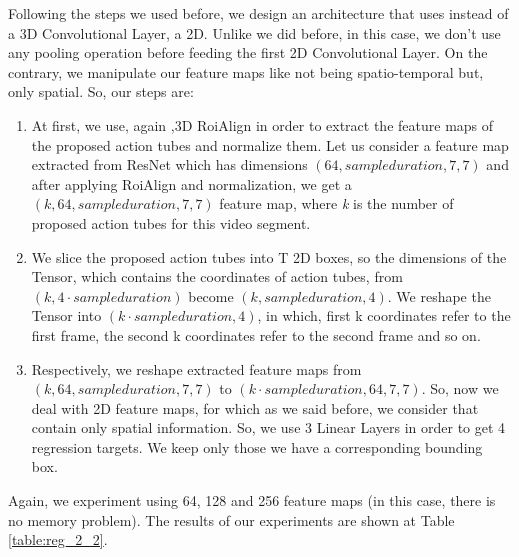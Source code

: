 Following the steps we used before, we design an architecture that uses instead of a 3D Convolutional Layer, a 2D. Unlike we did before, in this case, we don't
use any pooling operation before feeding the first 2D Convolutional Layer. On the contrary, we manipulate our feature maps like not being spatio-temporal but,
only spatial. So, our steps are:
\begin{enumerate}
\item At first, we use, again ,3D RoiAlign in order to extract the feature maps of the proposed action tubes and normalize them. Let us consider a feature map
  extracted from ResNet which has dimensions $(64,sample duration,7,7)$ and after applying RoiAlign and normalization, we get a $(k,64,sample duration,7,7)$ feature map,
  where \textit{k} is the number of proposed  action tubes for this video segment.
\item We slice the proposed action tubes into T 2D boxes, so the dimensions of the Tensor, which contains the coordinates of action tubes, from $(k,4\cdot sample duration)$
  become $(k,sample duration, 4)$. We reshape the Tensor into $(k\cdot sample duration, 4)$, in which, first k coordinates refer to the first frame, the
  second k coordinates refer to the second frame and so on.
\item Respectively, we reshape extracted feature maps from $(k, 64, sample duration, 7, 7)$ to $(k\cdot sample duration, 64, 7, 7)$. So, now we deal with 2D feature maps, for which as we said before,
  we consider that contain only spatial information. So, we use 3 Linear Layers in order to get 4 regression targets. We keep only those we have a corresponding bounding
  box.
\end{enumerate}

Again, we experiment using 64, 128 and 256 feature maps (in this case, there is no memory problem). The results of our experiments are shown at Table \ref{table:reg_2_2}.

